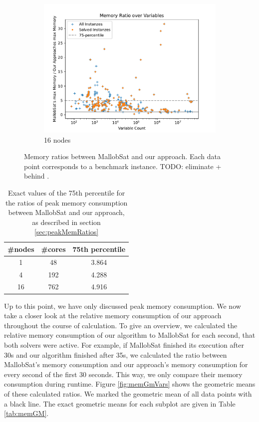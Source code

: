 \documentclass[12pt,a4paper,twoside]{scrartcl}
\numberwithin{equation}{section}
\begin{document}
\begin{figure}
\begin{subfigure}[c]{.45\textwidth}
    \includegraphics[scale=.45]{plots/16node_compare/mem_ratio_over_vars.pdf}
    \caption{16 nodes}
    \label{fig:memRatiosVars16node}
  \end{subfigure}
  \caption{Memory ratios between MallobSat and our approach. Each data point corresponds to a benchmark instance. TODO: eliminate + behind .}
  \label{fig:memRatiosVars}
\end{figure}

\begin{table}
  \center
  \begin{tabular}{ ccc }
    \toprule
    \#nodes & \#cores & 75th percentile \\
    \midrule
    1  & 48  & 3.864\\
    4  & 192 & 4.288\\
    16 & 762 & 4.916\\
    \bottomrule
  \end{tabular}
  \caption{Exact values of the 75th percentile for the ratios of peak memory consumption between MallobSat and our approach, as described in section \ref{sec:peakMemRatios}}
  \label{tab:memRatioPercentiles}
\end{table}

\label{sec:GMs}
Up to this point, we have only discussed peak memory consumption. We now take a closer look at the relative memory consumption of our approach throughout the course of calculation. To give an overview, we calculated the relative memory consumption of our algorithm to MallobSat for each second, that both solvers were active. For example, if MallobSat finished its execution after 30s and our algorithm finished after 35s, we calculated the ratio between MallobSat's memory consumption and our approach's memory consumption for every second of the first 30 seconds. This way, we only compare their memory consumption during runtime. Figure \ref{fig:memGmVars} shows the geometric means of these calculated ratios. We marked the geometric mean of all data points with a black line. The exact geometric means for each subplot are given in Table \ref{tab:memGM}.
\end{document}
